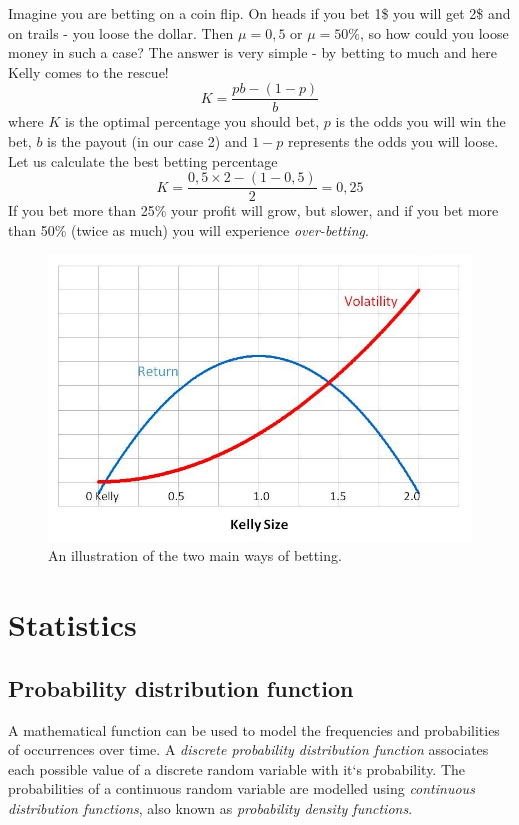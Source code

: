 \documentclass[12pt, a4paper,leqno]{report}
\theoremstyle{normal}
\theoremstyle{normal}
\begin{document}
	Imagine you are betting on a coin flip. On heads if you bet 1\$ you will get 2\$ and on trails - you loose the dollar. Then $\mu = 0,5$ or $\mu = 50\%$, so how could you loose money in such a case? The answer is very simple - by betting to much and here Kelly comes to the rescue!
	\[ K = \frac{pb - (1 - p)}{b} \]
	where $K$ is the optimal percentage you should bet, $p$ is the odds you will win the bet, $b$ is the payout (in our case 2) and $1-p$ represents the odds you will loose. Let us calculate the best betting percentage
	\[ K = \frac{0,5\times 2 - (1-0,5)}{2} = 0,25 \] 
	If you bet more than 25\% your profit will grow, but slower, and if you bet more than 50\% (twice as much) you will experience \textit{over-betting}.
	\begin{figure}[h!]
		\caption{An illustration of the two main ways of betting.}
		\centering
			\includegraphics[width=12cm]{kelly.jpg}
	\end{figure}
	
	\chapter{Statistics}
	\section{Probability distribution function}
	A mathematical function can be used to model the frequencies and probabilities of occurrences over time. A \textit{discrete probability distribution function} associates each possible value of a discrete random variable with it`s probability. The probabilities of a continuous random variable are modelled using \textit{continuous distribution functions}, also known as \textit{probability density functions}.
	
\end{document}

